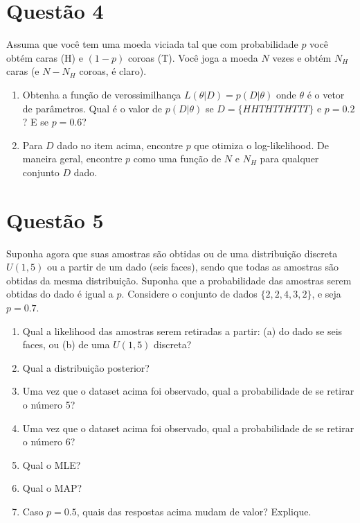 \documentclass[12 pt]{article}
\begin{document}
\section*{Questão 4}
Assuma que você tem uma moeda viciada tal que com probabilidade $p$ você obtém caras (H) e $(1 - p)$ coroas (T). Você joga a moeda $N$ vezes e obtém $N_H$ caras (e $N - N_H$ coroas, é claro).
\begin{enumerate}
    \item Obtenha a função de verossimilhança $L(\theta|D) = p(D|\theta)$ onde $\theta$ é o vetor de parâmetros. Qual é o valor de $p(D|\theta)$ se $D = \{HHT HT T HT T T\}$ e $p = 0.2$? E se $p = 0.6$?
    \item Para $D$ dado no item acima, encontre $p$ que otimiza o log-likelihood. De maneira geral, encontre $p$ como uma função de $N$ e $N_H$ para qualquer conjunto $D$ dado.
\end{enumerate}

\section*{Questão 5}
Suponha agora que suas amostras são obtidas ou de uma distribuição discreta $U(1, 5)$ ou a partir de um dado (seis faces), sendo que todas as amostras são obtidas da mesma distribuição. Suponha que a probabilidade das amostras serem obtidas do dado é igual a $p$. Considere o conjunto de dados $\{2, 2, 4, 3, 2\}$, e seja $p = 0.7$.
\begin{enumerate}
    \item Qual a likelihood das amostras serem retiradas a partir: (a) do dado se seis faces, ou (b) de uma $U(1, 5)$ discreta?
    \item Qual a distribuição posterior?
    \item Uma vez que o dataset acima foi observado, qual a probabilidade de se retirar o número 5?
    \item Uma vez que o dataset acima foi observado, qual a probabilidade de se retirar o número 6?
    \item Qual o MLE?
    \item Qual o MAP?
    \item Caso $p = 0.5$, quais das respostas acima mudam de valor? Explique.
\end{enumerate}
\end{document}
